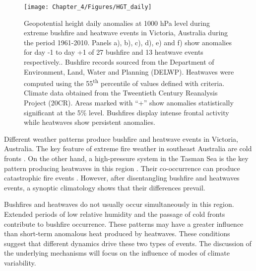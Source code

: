 \begin{figure}[h]
\noindent \begin{centering}
\texttt{[image: Chapter\_4/Figures/HGT\_daily]}
\par\end{centering}

\caption[Geopotential height daily anomalies at 1000 hPa level during extreme
bushfire and heatwave events in Victoria, Australia during the period
1961-2010]{Geopotential height daily anomalies at 1000 hPa level during extreme
bushfire and heatwave events in Victoria, Australia during the period
1961-2010. Panels a), b), c), d), e) and f) show anomalies for day
-1 to day +1 of 27 bushfire and 13 heatwave events respectively..
Bushfire records sourced from the Department of Environment, Land,
Water and Planning (DELWP). Heatwaves were computed using the 55\protect\textsuperscript{th}
percentile of values defined with \citet{Nairn2009} criteria. Climate
data obtained from the Tweentieth Century Reanalysis Project (20CR).
Areas marked with ``+'' show anomalies statistically significant
at the 5\% level. Bushfires display intense frontal activity while
heatwaves show persistent anomalies. \label{fig: Geopotential height daily anomalies at 1000 hPa level during extreme bushfire and heatwave events in Victoria, Australia during the period 1961-2010}}


\end{figure}

Different weather patterns produce bushfire and heatwave events in
Victoria, Australia. The key feature of extreme fire weather in southeast
Australia are cold fronts \citep{Reeder1987,Reeder2015}. On the other
hand, a high-pressure system in the Tasman Sea is the key pattern
producing heatwaves in this region \citep{Pezza2012,Parker2014a}.
Their co-occurrence can produce catastrophic fire events \citep{Mills2005,Engel2013}.
However, after disentangling bushfire and heatwaves events, a synoptic
climatology shows that their differences prevail. 

Bushfires and heatwaves do not usually occur simultaneously in this
region. Extended periods of low relative humidity and the passage of cold fronts
contribute to bushfire occurrence. These patterns may have a greater
influence than short-term anomalous heat produced by heatwaves. These
conditions suggest that different dynamics drive these two types of
events. The discussion of the underlying mechanisms will focus on
the influence of modes of climate variability. 


